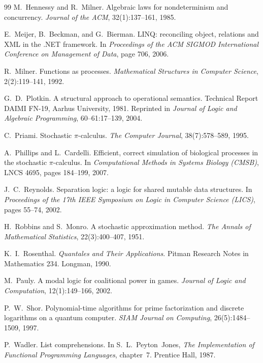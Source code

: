 \documentclass[11pt]{article}
\theoremstyle{definition}
\theoremstyle{plain}
\theoremstyle{remark}
\begin{document}
\begin{thebibliography}{99}
M.~Hennessy and R.~Milner.
\newblock Algebraic laws for nondeterminism and concurrency.
\newblock \emph{Journal of the ACM}, 32(1):137--161, 1985.

E.~Meijer, B.~Beckman, and G.~Bierman.
\newblock LINQ: reconciling object, relations and XML in the .NET framework.
\newblock In \emph{Proceedings of the ACM SIGMOD International Conference on
Management of Data}, page 706, 2006.

R.~Milner.
\newblock Functions as processes.
\newblock \emph{Mathematical Structures in Computer Science}, 2(2):119--141,
1992.

G.~D.~Plotkin.
\newblock A structural approach to operational semantics.
\newblock Technical Report DAIMI FN-19, Aarhus University, 1981.
\newblock Reprinted in \emph{Journal of Logic and Algebraic Programming},
60--61:17--139, 2004.

C.~Priami.
\newblock Stochastic $\pi$-calculus.
\newblock \emph{The Computer Journal}, 38(7):578--589, 1995.

A.~Phillips and L.~Cardelli.
\newblock Efficient, correct simulation of biological processes in the
stochastic $\pi$-calculus.
\newblock In \emph{Computational Methods in Systems Biology (CMSB)}, LNCS 4695,
pages 184--199, 2007.

J.~C.~Reynolds.
\newblock Separation logic: a logic for shared mutable data structures.
\newblock In \emph{Proceedings of the 17th IEEE Symposium on Logic in Computer
Science (LICS)}, pages 55--74, 2002.

H.~Robbins and S.~Monro.
\newblock A stochastic approximation method.
\newblock \emph{The Annals of Mathematical Statistics}, 22(3):400--407, 1951.

K.~I.~Rosenthal.
\newblock \emph{Quantales and Their Applications}.
\newblock Pitman Research Notes in Mathematics 234. Longman, 1990.

M.~Pauly.
\newblock A modal logic for coalitional power in games.
\newblock \emph{Journal of Logic and Computation}, 12(1):149--166, 2002.

P.~W.~Shor.
\newblock Polynomial-time algorithms for prime factorization and discrete
logarithms on a quantum computer.
\newblock \emph{SIAM Journal on Computing}, 26(5):1484--1509, 1997.

P.~Wadler.
\newblock List comprehensions.
\newblock In S.~L.~Peyton~Jones, \emph{The Implementation of Functional
Programming Languages}, chapter~7. Prentice Hall, 1987.


\end{thebibliography}
\end{document}

